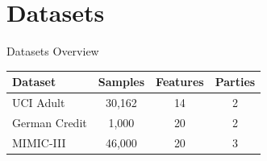 \documentclass[aspectratio=169, 11pt]{beamer}
\begin{document}
\section{Datasets}

\begin{frame}{Datasets Overview}
    \begin{table}[]
        \centering
        \large
        \begin{tabular}{lccc}
            \toprule
            \textbf{Dataset} & \textbf{Samples} & \textbf{Features} & \textbf{Parties} \\
            \midrule
            UCI Adult & 30,162 & 14 & 2 \\
            German Credit & 1,000 & 20 & 2 \\
            MIMIC-III & 46,000 & 20 & 3 \\
            \bottomrule
        \end{tabular}
    \end{table}
\end{frame}
\end{document}
